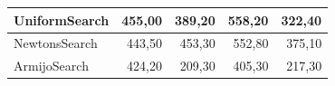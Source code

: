 \documentclass[a4paper,english,titlepage,12pt]{article}
\begin{document}
\begin{table}[H]
\begin{tabular}{|l|r|r|r|r|}
    UniformSearch                                                             & \cellcolor[HTML]{FCEDEC}455,00                           & 389,20                                                    & 558,20                                                    & \cellcolor[HTML]{F0F9F5}322,40                            \\ \hline
    NewtonsSearch                                                             & \cellcolor[HTML]{F0F9F5}443,50                           & 453,30                                                    & 552,80                                                    & 375,10                                                    \\ \hline
    ArmijoSearch                                                              & \cellcolor[HTML]{7BC9A3}424,20                           & \cellcolor[HTML]{7BC9A3}209,30                            & \cellcolor[HTML]{7BC9A3}405,30                            & \cellcolor[HTML]{7BC9A3}217,30                            \\ \hline
    \end{tabular}
\end{table}
\end{document}

